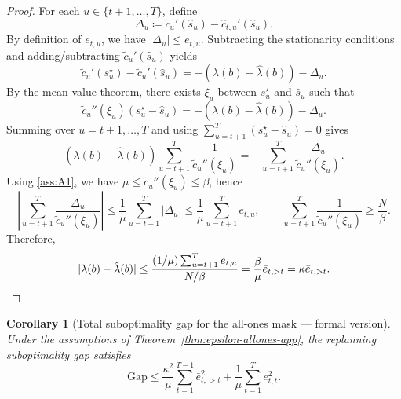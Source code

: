 \documentclass{uai2026} %
\newtheorem{corollary}[theorem]{Corollary}
\newcommand{\1}{\mathbf{1}}
\begin{document}
\begin{proof}
  For each $u \in \{t+1,\dots,T\}$, define
  \begin{equation*}
    \Delta_u \coloneqq \tilde{c}_u'(\hat{s}_u)-\hat{c}_{t,u}'(\hat{s}_u).
  \end{equation*}
  By definition of $e_{t,u}$, we have $|\Delta_u| \le e_{t,u}$.
  Subtracting the stationarity conditions and adding/subtracting $\tilde{c}_u'(\hat{s}_u)$ yields
  \begin{equation*}
    \tilde{c}_u'(s_u^\star)-\tilde{c}_u'(\hat{s}_u)
    =
    -\left(\lambda(b)-\hat{\lambda}(b)\right)-\Delta_u.
  \end{equation*}
  By the mean value theorem, there exists $\xi_u$ between $s_u^\star$ and $\hat{s}_u$ such that
  \begin{equation*}
    \tilde{c}_u''(\xi_u)(s_u^\star-\hat{s}_u)
    =
    -\left(\lambda(b)-\hat{\lambda}(b)\right)-\Delta_u.
  \end{equation*}
  Summing over $u=t+1,\dots,T$ and using $\sum_{u=t+1}^{T}(s_u^\star-\hat{s}_u)=0$ gives
  \begin{equation*}
    \left(\lambda(b)-\hat{\lambda}(b)\right)\sum_{u=t+1}^{T}\frac{1}{\tilde{c}_u''(\xi_u)}
    =
    -\sum_{u=t+1}^{T}\frac{\Delta_u}{\tilde{c}_u''(\xi_u)}.
  \end{equation*}
  Using \ref{ass:A1}, we have $\mu \le \tilde{c}_u''(\xi_u) \le \beta$, hence
  \begin{equation*}
    \left|\sum_{u=t+1}^{T}\frac{\Delta_u}{\tilde{c}_u''(\xi_u)}\right|
    \le
    \frac{1}{\mu}\sum_{u=t+1}^{T}|\Delta_u|
    \le
    \frac{1}{\mu}\sum_{u=t+1}^{T}e_{t,u},
    \qquad
    \sum_{u=t+1}^{T}\frac{1}{\tilde{c}_u''(\xi_u)}
    \ge
    \frac{N}{\beta}.
  \end{equation*}
  Therefore,
  \begin{equation*}
    |\lambda(b)-\hat{\lambda}(b)|
    \le
    \frac{(1/\mu)\sum_{u=t+1}^{T}e_{t,u}}{N/\beta}
    =
    \frac{\beta}{\mu}\bar{e}_{t,>t}
    =
    \kappa\bar{e}_{t,>t}.
    \qedhere
  \end{equation*}
\end{proof}

\begin{corollary}[Total suboptimality gap for the all-ones mask --- formal version]
  \label{cor:regret-allones-app}%
  Under the assumptions of Theorem~\ref{thm:epsilon-allones-app},
  the replanning suboptimality gap satisfies
  \begin{equation*}
    \mathrm{Gap}
    \le \frac{\kappa^{2}}{\mu}\sum_{t=1}^{T-1} \bar{e}_{t,>t}^{2}
    + \frac{1}{\mu}\sum_{t=1}^{T} e_{t,t}^{2}.
  \end{equation*}
\end{corollary}
\end{document}
